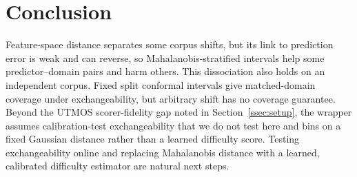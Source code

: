 \vspace{-.2cm}
\section{Conclusion}
\label{sec:conclusion}

Feature-space distance separates some corpus shifts, but its link to prediction error is weak and can reverse, so Mahalanobis-stratified intervals help some predictor--domain pairs and harm others. This dissociation also holds on an independent corpus. Fixed split conformal intervals give matched-domain coverage under exchangeability, but arbitrary shift has no coverage guarantee. Beyond the UTMOS scorer-fidelity gap noted in Section~\ref{ssec:setup}, the wrapper assumes calibration-test exchangeability that we do not test here and bins on a fixed Gaussian distance rather than a learned difficulty score. Testing exchangeability online and replacing Mahalanobis distance with a learned, calibrated difficulty estimator are natural next steps.
